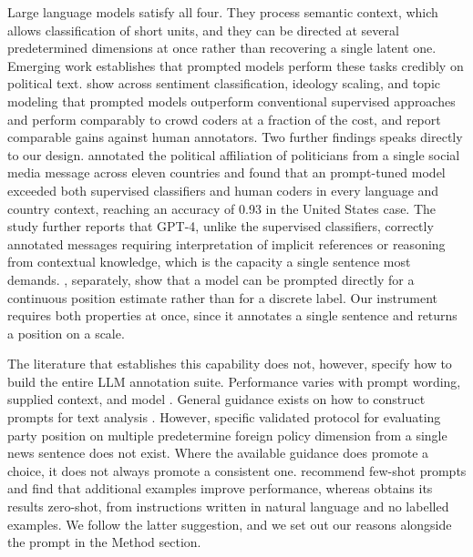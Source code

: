 Large language models satisfy all four. They process semantic context, which allows classification of short units, and they can be directed at several predetermined dimensions at once rather than recovering a single latent one. Emerging work establishes that prompted models perform these tasks credibly on political text. \citet{ornsteinHowTrainYour2025} show across sentiment classification, ideology scaling, and topic modeling that prompted models outperform conventional supervised approaches and perform comparably to crowd coders at a fraction of the cost, and \citet{gilardiChatGPTOutperformsCrowd2023} report comparable gains against human annotators. Two further findings speaks directly to our design. \citet{tornbergLargeLanguageModels2025} annotated the political affiliation of politicians from a single social media message across eleven countries and found that an prompt-tuned model exceeded both supervised classifiers and human coders in every language and country context, reaching an accuracy of 0.93 in the United States case. The study further reports that GPT-4, unlike the supervised classifiers, correctly annotated messages requiring interpretation of implicit references or reasoning from contextual knowledge, which is the capacity a single sentence most demands. \citet{mensPositioningPoliticalTexts2025}, separately, show that a model can be prompted directly for a continuous position estimate rather than for a discrete label. Our instrument requires both properties at once, since it annotates a single sentence and returns a position on a scale.

The literature that establishes this capability does not, however, specify how to build the entire LLM annotation suite. Performance varies with prompt wording, supplied context, and model \citep{ornsteinHowTrainYour2025}. General guidance exists on how to construct prompts for text analysis \citep{tornbergBestPracticesText2024}. However, specific validated protocol for evaluating party position on multiple predetermine foreign policy dimension from a single news sentence does not exist. Where the available guidance does promote a choice, it does not always promote a consistent one. \citet{ornsteinHowTrainYour2025} recommend few-shot prompts and find that additional examples improve performance, whereas \citet{tornbergLargeLanguageModels2025} obtains its results zero-shot, from instructions written in natural language and no labelled examples. We follow the latter suggestion, and we set out our reasons alongside the prompt in the Method section.

